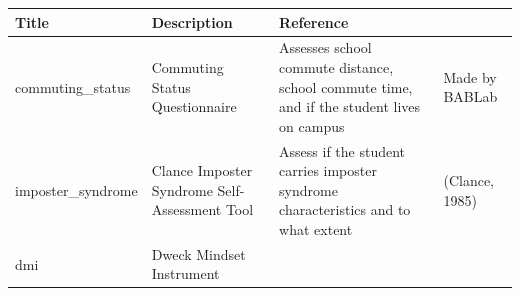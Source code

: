 \documentclass[]{book}
\begin{document}
\begin{longtable}[]{@{}llll@{}}
\toprule
\begin{minipage}[b]{0.22\columnwidth}\raggedright
Title\strut
\end{minipage} & \begin{minipage}[b]{0.27\columnwidth}\raggedright
Description\strut
\end{minipage} & \begin{minipage}[b]{0.22\columnwidth}\raggedright
Reference\strut
\end{minipage} & \begin{minipage}[b]{0.18\columnwidth}\raggedright
\strut
\end{minipage}\tabularnewline
\midrule
\endhead
\begin{minipage}[t]{0.22\columnwidth}\raggedright
commuting\_status\strut
\end{minipage} & \begin{minipage}[t]{0.27\columnwidth}\raggedright
Commuting Status Questionnaire\strut
\end{minipage} & \begin{minipage}[t]{0.22\columnwidth}\raggedright
Assesses school commute distance, school commute time, and if the student lives on campus\strut
\end{minipage} & \begin{minipage}[t]{0.18\columnwidth}\raggedright
Made by BABLab\strut
\end{minipage}\tabularnewline
\begin{minipage}[t]{0.22\columnwidth}\raggedright
imposter\_syndrome\strut
\end{minipage} & \begin{minipage}[t]{0.27\columnwidth}\raggedright
Clance Imposter Syndrome Self-Assessment Tool\strut
\end{minipage} & \begin{minipage}[t]{0.22\columnwidth}\raggedright
Assess if the student carries imposter syndrome characteristics and to what extent\strut
\end{minipage} & \begin{minipage}[t]{0.18\columnwidth}\raggedright
(Clance, 1985)\strut
\end{minipage}\tabularnewline
\begin{minipage}[t]{0.22\columnwidth}\raggedright
dmi\strut
\end{minipage} & \begin{minipage}[t]{0.27\columnwidth}\raggedright
Dweck Mindset Instrument\strut
\end{minipage} & \begin{minipage}[t]{0.22\columnwidth}\raggedright

\end{minipage}
\end{longtable}
\end{document}
